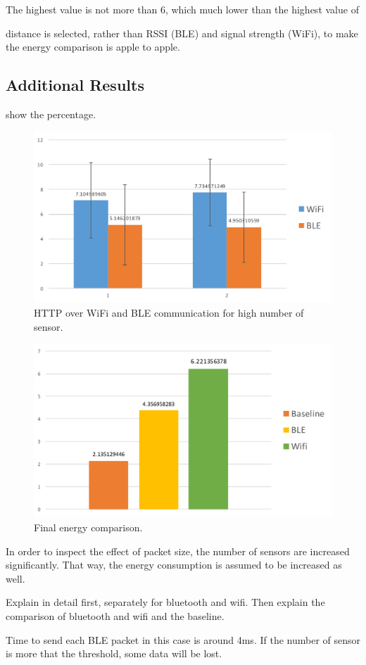 \documentclass[journal]{vgtc}                %
\begin{document}
The highest value is not more than 6, which much lower than the highest value of 

distance is selected, rather than RSSI (BLE) and signal strength (WiFi), to make the energy comparison is apple to apple.


\subsection{Additional Results} %
\label{sub:additional_results}
show the percentage.




\begin{figure}
  \centering
    \includegraphics[width=.5\textwidth]{ble-vs-wifi}
  \caption{HTTP over WiFi and BLE communication for high number of sensor.}
  \label{fig:ble-vs-wifi-result}
\end{figure}

\begin{figure}
  \centering
    \includegraphics[width=.5\textwidth]{baseline-ble-wifi}
  \caption{Final energy comparison.}
  \label{fig:baseline-ble-wifi}
\end{figure}

In order to inspect the effect of packet size, the number of sensors are increased significantly. That way, the energy consumption is assumed to be increased as well.

Explain in detail first, separately for bluetooth and wifi.
Then explain the comparison of bluetooth and wifi and the baseline.

Time to send each BLE packet in this case is around 4ms. If the number of sensor is more that the threshold, some data will be lost.
\end{document}
